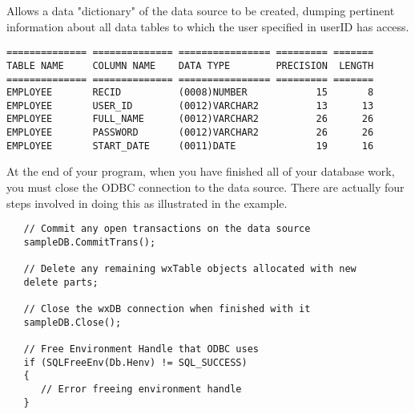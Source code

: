 



Allows a data "dictionary" of the data source to be created, dumping pertinent information about all data tables to which the user specified in userID has access. 

\begin{verbatim}
============== ============== ================ ========= =======
TABLE NAME     COLUMN NAME    DATA TYPE        PRECISION  LENGTH
============== ============== ================ ========= =======
EMPLOYEE       RECID          (0008)NUMBER            15       8
EMPLOYEE       USER_ID        (0012)VARCHAR2          13      13
EMPLOYEE       FULL_NAME      (0012)VARCHAR2          26      26
EMPLOYEE       PASSWORD       (0012)VARCHAR2          26      26
EMPLOYEE       START_DATE     (0011)DATE              19      16
\end{verbatim}





At the end of your program, when you have finished all of your database work, you must close the ODBC connection to the data source.  There are actually four steps involved in doing this as illustrated in the example.

\begin{verbatim}
   // Commit any open transactions on the data source
   sampleDB.CommitTrans();

   // Delete any remaining wxTable objects allocated with new
   delete parts;

   // Close the wxDB connection when finished with it
   sampleDB.Close();

   // Free Environment Handle that ODBC uses
   if (SQLFreeEnv(Db.Henv) != SQL_SUCCESS)
   {
      // Error freeing environment handle
   }
\end{verbatim}
